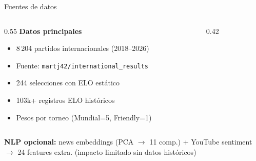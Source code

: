 \documentclass[aspectratio=169,10pt]{beamer}
\newcommand{\code}[1]{\texttt{#1}}
\begin{document}
\begin{frame}{Fuentes de datos}

  \begin{columns}[T]
    \begin{column}{0.55\textwidth}
      \textbf{Datos principales}
      \begin{itemize}\small
        \item \alert{8\,204} partidos internacionales (2018--2026)
        \item Fuente: \code{martj42/international\_results}
        \item 244 selecciones con ELO estático
        \item \alert{103k+} registros ELO históricos
        \item Pesos por torneo (Mundial=5, Friendly=1)
      \end{itemize}
    \end{column}
    \begin{column}{0.42\textwidth}
    \end{column}
  \end{columns}

  \vspace{0.3cm}
  \textbf{NLP opcional:} news embeddings (PCA $\to$ 11 comp.) +
  YouTube sentiment $\to$ 24 features extra.
  \textcolor{gris}{(impacto limitado sin datos históricos)}
\end{frame}
\end{document}
